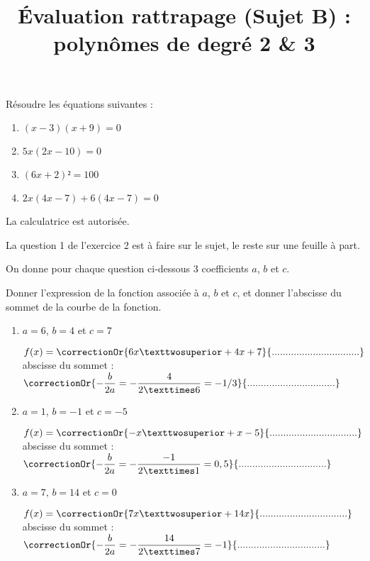 \documentclass[
	classe=$1^{ere}STI2D$,
	headerTitle=Évaluation\space Chapitre\space 4
]{évaluation}
\begin{document}
\begin{exercice}
	Résoudre les équations suivantes :
	\begin{enumerate}
		\item $(x - 3)(x + 9) = 0$
		\item $5x(2x - 10) = 0$
		\item $(6x + 2)² = 100$
		\item $2x(4x - 7) + 6(4x - 7) = 0$
	\end{enumerate}
\end{exercice}

\newpage
\setcounter{exercice}{1}

\title{Évaluation rattrapage (Sujet B) : polynômes de degré 2 \& 3}
\maketitle

\begin{tcolorbox}
	La calculatrice est autorisée.

	La question 1 de l'exercice 2 est à faire sur le sujet, le reste sur une feuille à part.
\end{tcolorbox}

\begin{exercice}
	On donne pour chaque question ci-dessous 3 coefficients $a$, $b$ et $c$.

	Donner l'expression de la fonction associée à $a$, $b$ et $c$, et donner l'abscisse du sommet de la courbe de la fonction.
	\begin{enumerate}
		\item $a = 6$, $b = 4$ et $c = 7$

		      \ifdefined\makeCorrection
			      $f(x) = \correctionOr{6x² + 4x + 7}{................................}$ \hspace{5em} abscisse du sommet : $\correctionOr{-\dfrac{b}{2a} = -\dfrac{4}{2×6} = -1/3}{................................}$
		      \fi
		\item $a = 1$, $b = -1$ et $c = -5$

		      \ifdefined\makeCorrection
			      $f(x) = \correctionOr{-x² + x - 5}{................................}$ \hspace{5em} abscisse du sommet : $\correctionOr{-\dfrac{b}{2a} = -\dfrac{-1}{2×1} = 0,5}{................................}$
		      \fi
		\item $a = 7$, $b = 14$ et $c = 0$

		      \ifdefined\makeCorrection
			      $f(x) = \correctionOr{7x² + 14x}{................................}$ \hspace{5em} abscisse du sommet : $\correctionOr{-\dfrac{b}{2a} = -\dfrac{14}{2×7} = -1}{................................}$
		      \fi
	\end{enumerate}
\end{exercice}
\end{document}
